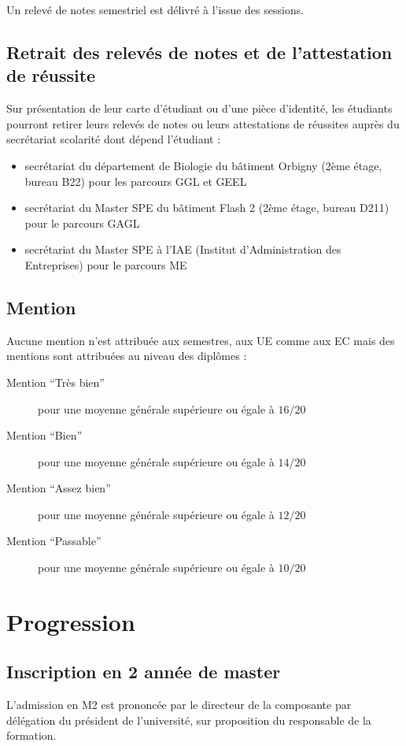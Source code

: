 \documentclass[a4paper,11pt]{article}
\begin{document}
Un relevé de notes semestriel est délivré à l'issue des sessions.



\subsection{Retrait des relevés de notes et de l'attestation de réussite}
Sur présentation de leur carte d'étudiant ou d'une pièce d'identité, les étudiants pourront retirer leurs relevés de notes ou leurs attestations de réussites auprès du secrétariat scolarité dont dépend l'étudiant : 
\begin{itemize}
\item secrétariat du département de Biologie du bâtiment Orbigny (2ème étage, bureau B22) pour les parcours GGL et GEEL
\item secrétariat du Master SPE du bâtiment Flash 2 (2ème étage, bureau D211) pour le parcours GAGL
\item secrétariat du Master SPE à l'IAE (Institut d'Administration des Entreprises) pour le parcours ME
\end{itemize}



\subsection{Mention}
Aucune mention n'est attribuée aux semestres, aux UE comme aux EC mais des mentions sont attribuées au niveau des diplômes :
\begin{description}
	\item[Mention ``Très bien'']	 pour une moyenne générale supérieure ou égale à $16/20$
\item[Mention ``Bien''] pour une moyenne générale supérieure ou égale à $14/20$
\item[Mention ``Assez bien''] pour une moyenne générale supérieure ou égale à $12/20$
\item[Mention ``Passable''] pour une moyenne générale supérieure ou égale à $10/20$
\end{description}




\section{Progression}\label{Progression}
\subsection{Inscription en 2\ieme{} année de master}
L'admission en M2 est prononcée par le directeur de la composante par délégation du président de l'université, sur proposition du responsable de la formation.
\end{document}
